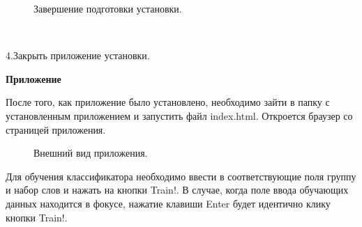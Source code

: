 \documentclass[14pt,a4paper]{extreport}
\begin{document}
    \begin{figure}[h]
    \caption{Завершение подготовки установки.}
    \label{ris:image}
    \end{figure}
    \\
    \par4.Закрыть приложение установки.
    \newpage
    \par\textbf{Приложение}
    \par После того, как приложение было установлено, необходимо зайти в папку с установленным приложением и запустить файл index.html. Откроется браузер со страницей приложения.
    \begin{figure}[h]
    \caption{Внешний вид приложения.}
    \label{ris:image}
    \end{figure}
    \par Для обучения классификатора необходимо ввести в соответствующие поля группу и набор слов и нажать на кнопки Train!. В случае, когда поле ввода обучающих данных находится в фокусе, нажатие клавиши Enter будет идентично клику кнопки Train!.
\end{document}
